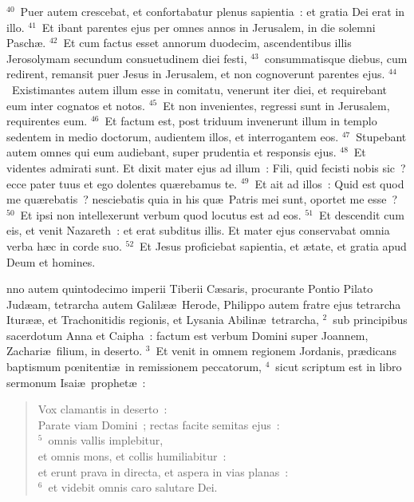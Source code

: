 ${}^{40}$~Puer autem crescebat, et confortabatur plenus sapientia~: et gratia Dei erat in illo.
${}^{41}$~Et ibant parentes ejus per omnes annos in Jerusalem, in die solemni Pasch\ae .
${}^{42}$~Et cum factus esset annorum duodecim, ascendentibus illis Jerosolymam secundum consuetudinem diei festi,
${}^{43}$~consummatisque diebus, cum redirent, remansit puer Jesus in Jerusalem, et non cognoverunt parentes ejus.
${}^{44}$~Existimantes autem illum esse in comitatu, venerunt iter diei, et requirebant eum inter cognatos et notos.
${}^{45}$~Et non invenientes, regressi sunt in Jerusalem, requirentes eum.
${}^{46}$~Et factum est, post triduum invenerunt illum in templo sedentem in medio doctorum, audientem illos, et interrogantem eos.
${}^{47}$~Stupebant autem omnes qui eum audiebant, super prudentia et responsis ejus.
${}^{48}$~Et videntes admirati sunt. Et dixit mater ejus ad illum~: Fili, quid fecisti nobis sic~? ecce pater tuus et ego dolentes qu\ae rebamus te.
${}^{49}$~Et ait ad illos~: Quid est quod me qu\ae rebatis~? nesciebatis quia in his qu\ae\ Patris mei sunt, oportet me esse~?
${}^{50}$~Et ipsi non intellexerunt verbum quod locutus est ad eos.
${}^{51}$~Et descendit cum eis, et venit Nazareth~: et erat subditus illis. Et mater ejus conservabat omnia verba h\ae c in corde suo.
${}^{52}$~Et Jesus proficiebat sapientia, et \ae tate, et gratia apud Deum et homines.

\bchapter
{}nno autem quintodecimo imperii Tiberii C\ae saris, procurante Pontio Pilato Jud\ae am, tetrarcha autem Galil\ae \ae\ Herode, Philippo autem fratre ejus tetrarcha Itur\ae \ae , et Trachonitidis regionis, et Lysania Abilin\ae\ tetrarcha,
${}^{2}$~sub principibus sacerdotum Anna et Caipha~: factum est verbum Domini super Joannem, Zachari\ae\ filium, in deserto.
${}^{3}$~Et venit in omnem regionem Jordanis, pr\ae dicans baptismum pœnitenti\ae\ in remissionem peccatorum,
${}^{4}$~sicut scriptum est in libro sermonum Isai\ae\ prophet\ae~: \begin{flushleft}\begin{verse}Vox clamantis in deserto~:\\ Parate viam Domini~; rectas facite semitas ejus~:\\
${}^{5}$~omnis vallis implebitur,\\ et omnis mons, et collis humiliabitur~:\\ et erunt prava in directa, et aspera in vias planas~:\\
${}^{6}$~et videbit omnis caro salutare Dei.\end{verse}\end{flushleft}



